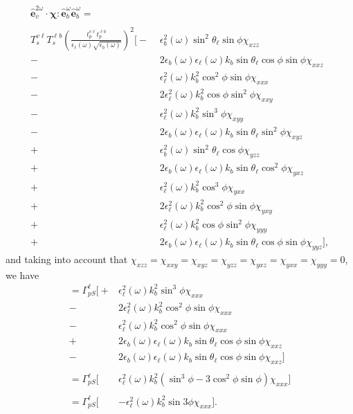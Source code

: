 \documentclass[10pt]{article}
\begin{document}
\begin{equation*}
\begin{split}
\hat{\mathbf{e}}^{2\omega}_{v}
\cdot\boldsymbol{\chi}:
\hat{\mathbf{e}}^{\omega}_{b}\hat{\mathbf{e}}^{\omega}_{b} =
\qquad\qquad\qquad&\\\\
T^{v\ell}_{s}T^{\ell b}_{s}\left(\frac{t^{v\ell}_{p}t^{\ell b}_{p}}
      {\epsilon_{\ell}(\omega)\sqrt{\epsilon_{b}(\omega)}}\right)^{2}
\big[
- &\epsilon_{b}^{2}(\omega)\sin^{2}\theta_{\ell}\sin\phi\chi_{xzz}\\
-&2\epsilon_{b}(\omega)\epsilon_{\ell}(\omega)k_{b}\sin\theta_{\ell}
   \cos\phi\sin\phi\chi_{xxz}\\
- &\epsilon^{2}_{\ell}(\omega)k^{2}_{b}\cos^{2}\phi\sin\phi\chi_{xxx}\\
-&2\epsilon^{2}_{\ell}(\omega)k^{2}_{b}\cos\phi\sin^{2}\phi\chi_{xxy}\\
- &\epsilon^{2}_{\ell}(\omega)k^{2}_{b}\sin^{3}\phi\chi_{xyy}\\
-&2\epsilon_{b}(\omega)\epsilon_{\ell}(\omega)k_{b}\sin\theta_{\ell}
   \sin^{2}\phi\chi_{xyz}\\
+ &\epsilon_{b}^{2}(\omega)\sin^{2}\theta_{\ell}\cos\phi\chi_{yzz}\\
+&2\epsilon_{b}(\omega)\epsilon_{\ell}(\omega)k_{b}\sin\theta_{\ell}
   \cos^{2}\phi\chi_{yxz}\\
+ &\epsilon^{2}_{\ell}(\omega)k^{2}_{b}\cos^{3}\phi\chi_{yxx}\\
+&2\epsilon^{2}_{\ell}(\omega)k^{2}_{b}\cos^{2}\phi\sin\phi\chi_{yxy}\\
+ &\epsilon^{2}_{\ell}(\omega)k^{2}_{b}\cos\phi\sin^{2}\phi\chi_{yyy}\\
+&2\epsilon_{b}(\omega)\epsilon_{\ell}(\omega)k_{b}\sin\theta_{\ell}
   \cos\phi\sin\phi\chi_{yyz}
\big],
\end{split}
\end{equation*}
and taking into account that $\chi_{xzz} = \chi_{xxy} = \chi_{xyz} = \chi_{yzz}
= \chi_{yxz} = \chi_{yxx} = \chi_{yyy} = 0$, we have
\begin{equation*}
\begin{split}
= \Gamma^{\ell}_{pS}
\big[
+ &\epsilon^{2}_{\ell}(\omega)k^{2}_{b}\sin^{3}\phi\chi_{xxx}\\
-&2\epsilon^{2}_{\ell}(\omega)k^{2}_{b}\cos^{2}\phi\sin\phi\chi_{xxx}\\
- &\epsilon^{2}_{\ell}(\omega)k^{2}_{b}\cos^{2}\phi\sin\phi\chi_{xxx}\\
+&2\epsilon_{b}(\omega)\epsilon_{\ell}(\omega)k_{b}\sin\theta_{\ell}
   \cos\phi\sin\phi\chi_{xxz}\\
-&2\epsilon_{b}(\omega)\epsilon_{\ell}(\omega)k_{b}\sin\theta_{\ell}
   \cos\phi\sin\phi\chi_{xxz}
\big]\\\\
= \Gamma^{\ell}_{pS}
\big[
&\epsilon^{2}_{\ell}(\omega)k^{2}_{b}
(\sin^{3}\phi - 3\cos^{2}\phi\sin\phi)\chi_{xxx}
\big]\\\\
= \Gamma^{\ell}_{pS}
\big[
&-\epsilon^{2}_{\ell}(\omega)k^{2}_{b}
\sin3\phi\chi_{xxx}
\big].
\end{split}
\end{equation*}
\end{document}
